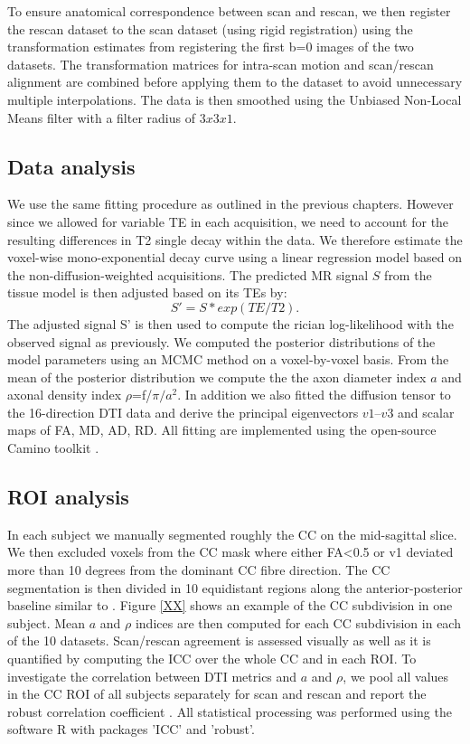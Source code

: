 To ensure anatomical correspondence between scan and rescan, we then register the rescan dataset to the scan dataset (using rigid registration) using the transformation estimates from registering  the first b=0 images of the two datasets. The transformation matrices for intra-scan motion and scan/rescan alignment are combined before applying them to the dataset to avoid unnecessary multiple interpolations. The data is then smoothed using the Unbiased Non-Local Means filter \citep{Aja-Fernandez:2010} with a filter radius of $3x3x1$.

\subsection*{Data analysis}
We use the same fitting procedure as outlined in the previous chapters. However since we allowed for variable TE in each acquisition, we need to account for the resulting differences in T2 single decay within the data. We therefore estimate the voxel-wise mono-exponential decay curve using a linear regression model based on the non-diffusion-weighted acquisitions. The predicted MR signal $S$ from the tissue model is then adjusted based on its \glspl{TE} by:
\begin{equation}
	S' = S * exp(TE/T2).
\end{equation}
The adjusted signal S' is then used to compute the rician log-likelihood with the observed signal as previously. We computed the posterior distributions of the model parameters using an MCMC method on a voxel-by-voxel basis. From the mean of the posterior distribution we compute the the axon diameter index $a$ and axonal density index $\rho$=f/$\pi/a^2$. In addition we also fitted the diffusion tensor to the 16-direction DTI data and derive the principal eigenvectors $v1$--$v3$ and scalar maps of FA, MD, AD, RD. All fitting are implemented using the open-source Camino toolkit \citep{Cook:2009}.
\subsection*{ROI analysis} In each subject we manually segmented roughly the CC on the mid-sagittal slice. We then excluded voxels from the CC mask where either FA<0.5 or v1 deviated more than 10 degrees from the dominant CC fibre direction. The CC segmentation is then divided in 10 equidistant regions along the anterior-posterior baseline similar to \cite{Aboitiz}. Figure \ref{XX} shows an example of the CC subdivision in one subject. Mean $a$ and $\rho$ indices are then computed for each CC subdivision in each of the 10 datasets. Scan/rescan agreement is assessed visually as well as it is quantified by computing the \gls{ICC} \citep{Shrout:1979} over the whole CC and in each \gls{ROI}. To investigate the correlation between DTI metrics and $a$ and $\rho$, we pool all values in the CC ROI of all subjects separately for scan and rescan and report the robust correlation coefficient \citep{XX}. All statistical processing was performed using the software R\citep{RCoreTeam:2012} with packages 'ICC'\citep{Wolak:2011} and 'robust'\citep{Wang:2012}.
\FloatBarrier
